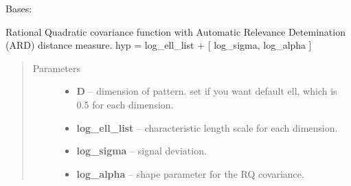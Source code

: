 \documentclass[letterpaper,10pt,english]{sphinxmanual}
\begin{document}
\begin{fulllineitems}
\label{pyGPs.Core:pyGPs.Core.cov.RQard}
Bases: {\hyperref[pyGPs.Core:pyGPs.Core.cov.Kernel]{}}

Rational Quadratic covariance function with Automatic Relevance Detemination
(ARD) distance measure.
hyp = log\_ell\_list + {[} log\_sigma, log\_alpha {]}
\begin{quote}\begin{description}
\item[{Parameters}] \leavevmode\begin{itemize}
\item {} 
\textbf{D} -- dimension of pattern. set if you want default ell, which is 0.5 for each dimension.

\item {} 
\textbf{log\_ell\_list} -- characteristic length scale for each dimension.

\item {} 
\textbf{log\_sigma} -- signal deviation.

\item {} 
\textbf{log\_alpha} -- shape parameter for the RQ covariance.

\end{itemize}

\end{description}\end{quote}

\begin{fulllineitems}
\label{pyGPs.Core:pyGPs.Core.cov.RQard.getCovMatrix}
\end{fulllineitems}


\begin{fulllineitems}
\label{pyGPs.Core:pyGPs.Core.cov.RQard.getDerMatrix}
\end{fulllineitems}


\end{fulllineitems}
\end{document}
